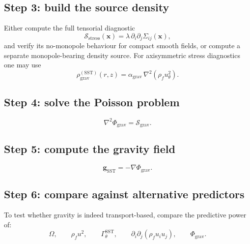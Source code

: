 \documentclass[11pt]{article}
\newcommand{\rhoF}{\rho_{\!f}}
\newcommand{\SST}{\mathrm{SST}}
\newcommand{\grav}{\mathrm{grav}}
\begin{document}
        \subsection*{Step 3: build the source density}
            Either compute the full tensorial diagnostic
            \begin{equation}
                \mathcal{S}_{\mathrm{stress}}(\mathbf{x})
                =
                \lambda\,\partial_i\partial_j \Sigma_{ij}(\mathbf{x}),
                \label{eq:workflow-S}
            \end{equation}
            and verify its no-monopole behaviour for compact smooth fields, or compute a separate monopole-bearing density source.  For axisymmetric stress diagnostics one may use
            \begin{equation}
                \rho_{\grav}^{(\SST)}(r,z)=\alpha_{\grav}\,\nabla^2(\rhoF u_\theta^2).
                \label{eq:workflow-rhog}
            \end{equation}
        
        \subsection*{Step 4: solve the Poisson problem}
            \begin{equation}
                \nabla^2 \Phi_{\grav} = \mathcal{S}_{\grav}.
                \label{eq:workflow-poisson}
            \end{equation}
        
        \subsection*{Step 5: compute the gravity field}
            \begin{equation}
                \mathbf{g}_{\SST} = -\nabla\Phi_{\grav}.
                \label{eq:workflow-g}
            \end{equation}
        
        \subsection*{Step 6: compare against alternative predictors}
            To test whether gravity is indeed transport-based, compare the predictive power of:
            \begin{equation}
                \Omega,
                \qquad
                \rhoF u^2,
                \qquad
                \Gamma_\theta^{\SST},
                \qquad
                \partial_i\partial_j(\rhoF u_i u_j),
                \qquad
                \Phi_{\grav}.
                \label{eq:workflow-comparison}
            \end{equation}
        
\end{document}
